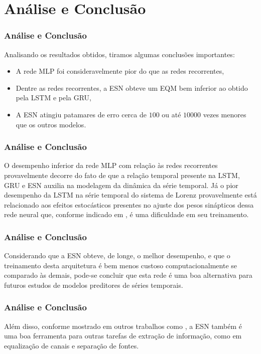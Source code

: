\documentclass[aspectratio=169]{beamer}
\begin{document}
\section{Análise e Conclusão}

\begin{frame}
\frametitle{Análise e Conclusão}

\justifying Analisando os resultados obtidos, tiramos algumas conclusões importantes:

    \begin{itemize}[<+-| alert@+>]   
    \item A rede MLP foi consideravelmente pior do que as redes recorrentes,
    \item Dentre as redes recorrentes, a ESN obteve um EQM bem inferior ao obtido pela LSTM e pela GRU, 
    \item A ESN  atingiu patamares de erro cerca de $100$ ou até $10000$ vezes menores que os outros modelos.
    \end{itemize}
\end{frame}

\begin{frame}
\frametitle{Análise e Conclusão}
\justifying O desempenho inferior da rede MLP com relação às redes recorrentes provavelmente decorre do fato de que a relação temporal presente na LSTM, GRU e ESN auxilia na modelagem da dinâmica da série temporal. Já o pior desempenho da LSTM na série temporal do sistema de Lorenz provavelmente está relacionado aos efeitos estocásticos presentes no ajuste dos pesos sinápticos dessa rede neural que, conforme indicado em \cite{doya1992bifurcations}, é uma dificuldade em seu treinamento.
\end{frame}

\begin{frame}
\frametitle{Análise e Conclusão}
\justifying Considerando que a ESN obteve, de longe, o melhor desempenho, e que o treinamento desta arquitetura é bem menos custoso computacionalmente se comparado às demais, pode-se concluir que esta rede é uma boa alternativa para futuros estudos de modelos preditores de séries temporais. 
\end{frame}

\begin{frame}
\frametitle{Análise e Conclusão}
\justifying Além disso, conforme mostrado em outros trabalhos como \cite{jaeger2004harnessing, jaeger2007echo, boccato2013novas}, a ESN também é uma boa ferramenta para outras tarefas de extração de informação, como em equalização de canais e separação de fontes. 
\end{frame}
\end{document}
